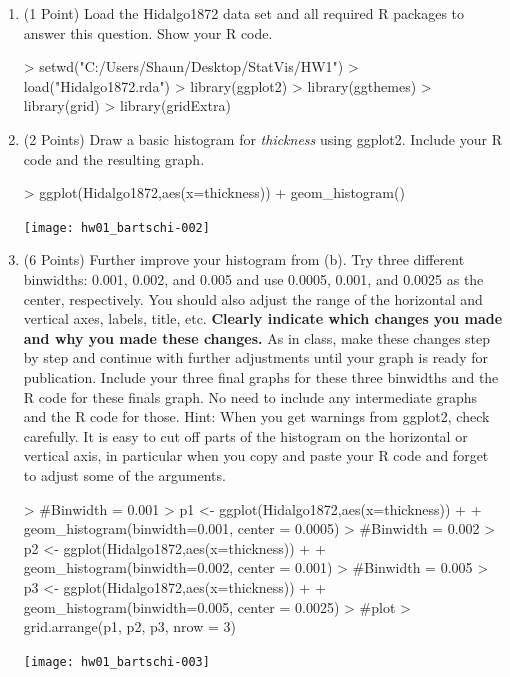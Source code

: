 \documentclass[12pt,letterpaper,final]{article}
\begin{document}
\begin{enumerate}
\break

\begin{enumerate}
\item (1 Point) 
Load the Hidalgo1872 data set and
all required R packages to answer this question. Show your R code.

\begin{Schunk}
\begin{Sinput}
> setwd("C:/Users/Shaun/Desktop/StatVis/HW1")
> load("Hidalgo1872.rda")
> library(ggplot2)
> library(ggthemes)
> library(grid)
> library(gridExtra)
\end{Sinput}
\end{Schunk}


\item (2 Points) 
Draw a basic histogram for {\it thickness} using ggplot2.
Include your R code and the resulting graph.

\begin{Schunk}
\begin{Sinput}
> ggplot(Hidalgo1872,aes(x=thickness)) + geom_histogram()
\end{Sinput}
\end{Schunk}
\texttt{[image: hw01\_bartschi-002]}


\item (6 Points) 
Further improve your histogram from (b). 
Try three different binwidths: 0.001, 0.002, and 0.005 and use 0.0005, 0.001, and 0.0025
as the center, respectively.
You should also adjust the
range of the horizontal and vertical axes, labels, title, etc. 
{\bf Clearly indicate which changes
you made and why you made these changes.}
As in class, make these changes step by step and continue with further
adjustments until your graph is ready for publication.
Include your three final graphs for these three binwidths and the R code
for these finals graph. No need to include any intermediate graphs and the R code for those.
Hint: When you get warnings from ggplot2, check carefully. It is easy to cut off
parts of the histogram on the horizontal or vertical axis, in particular when
you copy and paste your R code and forget to adjust some of the arguments.

\begin{Schunk}
\begin{Sinput}
> #Binwidth = 0.001
> p1 <- ggplot(Hidalgo1872,aes(x=thickness)) + 
+   geom_histogram(binwidth=0.001, center = 0.0005)
> #Binwidth = 0.002
> p2 <- ggplot(Hidalgo1872,aes(x=thickness)) + 
+   geom_histogram(binwidth=0.002, center = 0.001)
> #Binwidth = 0.005
> p3 <- ggplot(Hidalgo1872,aes(x=thickness)) + 
+   geom_histogram(binwidth=0.005, center = 0.0025)
> #plot
> grid.arrange(p1, p2, p3, nrow = 3)
\end{Sinput}
\end{Schunk}
\texttt{[image: hw01\_bartschi-003]}


\end{enumerate}
\end{enumerate}
\end{document}
